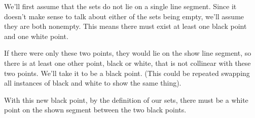 \documentclass[12pt]{article}
\begin{document}
We'll first assume that the sets do not lie on a single line segment. Since it doesn't make sense to talk about either of the sets being empty, we'll assume they are both nonempty. This means there must exist at least one black point and one white point.

\begin{center}
\end{center}

If there were only these two points, they would lie on the show line segment, so there is at least one other point, black or white, that is not collinear with these two points. We'll take it to be a black point. (This could be repeated swapping all instances of black and white to show the same thing).

\begin{center}
\end{center}

With this new black point, by the definition of our sets, there must be a white point on the shown segment between the two black points.

\begin{center}
\end{center}
\end{document}
